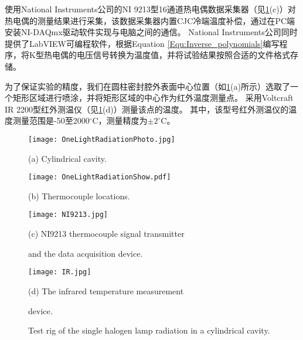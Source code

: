 使用National Instruments公司的NI 9213型16通道热电偶数据采集器（见\ref{Fig:OneLightRadiation}(c)）对热电偶的测量结果进行采集，该数据采集器内置CJC冷端温度补偿，通过在PC端安装NI-DAQmx驱动软件实现与电脑之间的通信。 National Instruments公司同时提供了LabVIEW可编程软件，根据Equation \ref{Equ:Inverse_polynomials}编写程序，将K型热电偶的电压信号转换为温度值，并将试验结果按照合适的文件格式存储。

为了保证实验的精度，我们在圆柱密封腔外表面中心位置（如\ref{Fig:OneLightRadiation}(a)所示）选取了一个矩形区域进行喷涂，并将矩形区域的中心作为红外温度测量点。
采用Voltcraft IR 2200型红外测温仪（见\ref{Fig:OneLightRadiation}(d)）测量该点的温度。
其中，该型号红外测温仪的温度测量范围是-50至2000$^{\circ}$C，测量精度为$\pm2^{\circ}$C。

\begin{figure}
  \begin{minipage}[t]{0.5\linewidth} %
  \nonumber
    \centering
    \texttt{[image: OneLightRadiationPhoto.jpg]}
    \centerline{(a) Cylindrical cavity.}
    \label{Fig:OneLightRadiationShow}
  \end{minipage}%
  \begin{minipage}[t]{0.5\linewidth}
    \centering
    \texttt{[image: OneLightRadiationShow.pdf]}
    \centerline{(b) Thermocouple locations.}
    \label{Fig:OneLightRadiationPhoto}
  \end{minipage}

  \begin{minipage}[t]{0.5\linewidth} %
  \nonumber
    \centering
    \texttt{[image: NI9213.jpg]}
    \centerline{(c) NI9213 thermocouple signal transmitter }
    \centerline{and the data acquisition device. }
    \label{Fig:NI9213}
  \end{minipage}%
  \begin{minipage}[t]{0.5\linewidth}
    \centering
    \texttt{[image: IR.jpg]}
    \centerline{(d) The infrared temperature measurement }
    \centerline{device.}
    \label{Fig:IR}
  \end{minipage}


  \caption{Test rig of the single halogen lamp radiation in a cylindrical cavity.}
  \label{Fig:OneLightRadiation}
\end{figure}

